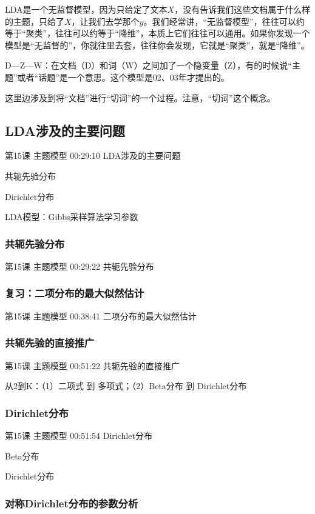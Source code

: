 \documentclass[UTF8]{ctexbook}
\begin{document}
LDA是一个无监督模型，因为只给定了文本$X$，没有告诉我们这些文档属于什么样的主题，只给了$X$，让我们去学那个$y$。我们经常讲，“无监督模型”，往往可以约等于“聚类”，往往可以约等于“降维”，本质上它们往往可以通用。如果你发现一个模型是“无监督的”，你就往里去套，往往你会发现，它就是“聚类”，就是“降维”。

D---Z---W：在文档（D）和词（W）之间加了一个隐变量（Z），有的时候说“主题”或者“话题”是一个意思。这个模型是02、03年才提出的。

这里边涉及到将“文档”进行“切词”的一个过程。注意，“切词”这个概念。

\subsection{LDA涉及的主要问题}

第15课 主题模型 00:29:10 LDA涉及的主要问题

共轭先验分布

Dirichlet分布

LDA模型：Gibbs采样算法学习参数

\subsubsection{共轭先验分布}

第15课 主题模型 00:29:22 共轭先验分布

\subsubsection{复习：二项分布的最大似然估计}

第15课 主题模型 00:38:41 二项分布的最大似然估计

\subsubsection{共轭先验的直接推广}

第15课 主题模型 00:51:22 共轭先验的直接推广

从2到K：（1）二项式   到  多项式；（2）Beta分布 到 Dirichlet分布

\subsubsection{Dirichlet分布}

第15课 主题模型 00:51:54 Dirichlet分布

Beta分布

 Dirichlet分布

\subsubsection{对称Dirichlet分布的参数分析}
\end{document}
